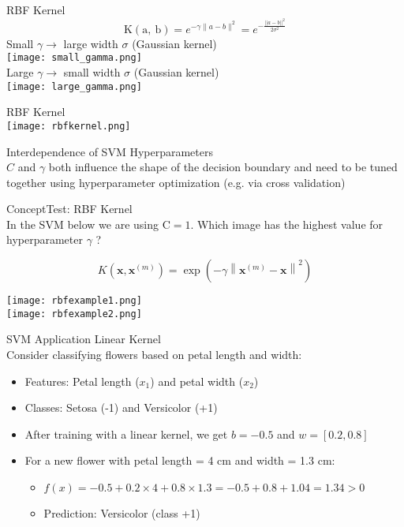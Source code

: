 \begin{definition}{RBF Kernel}
    \[ \mathrm{K}(\mathrm{a}, \mathrm{~b}) = e^{-\gamma\|a-b\|^2} = e^{-\frac{||a-b||^2}{2\sigma^2}} \]
    Small $\gamma \rightarrow$ large width $\sigma$ (Gaussian kernel)\\
    \texttt{[image: small\_gamma.png]}\\
    Large $\gamma \rightarrow$ small width $\sigma$ (Gaussian kernel)\\
    \texttt{[image: large\_gamma.png]}
\end{definition}

\begin{example2}{RBF Kernel}\\
    \texttt{[image: rbfkernel.png]}
\end{example2}

\begin{theorem}{Interdependence of SVM Hyperparameters}\\
    $C$ and $\gamma$ both influence the shape of the decision boundary and need to be tuned together 
    using hyperparameter optimization (e.g. via cross validation)
\end{theorem}

\begin{example2}{ConceptTest: RBF Kernel}\\
    In the SVM below we are using $\mathrm{C}=1$. Which image has the highest value for hyperparameter $\gamma$ ?

    \[ K\left(\mathbf{x}, \mathbf{x}^{(m)}\right)=\exp \left(-\gamma\left\|\mathbf{x}^{(m)}-\mathbf{x}\right\|^2\right) \]

    \texttt{[image: rbfexample1.png]}\\
    \texttt{[image: rbfexample2.png]}
\end{example2}

\begin{example}{SVM Application} Linear Kernel\\
Consider classifying flowers based on petal length and width:
\begin{itemize}
    \item Features: Petal length ($x_1$) and petal width ($x_2$)
    \item Classes: Setosa (-1) and Versicolor (+1)
    \item After training with a linear kernel, we get $b = -0.5$ and $w = [0.2, 0.8]$
    \item For a new flower with petal length = 4 cm and width = 1.3 cm:
    \begin{itemize}
        \item $f(x) = -0.5 + 0.2 \times 4 + 0.8 \times 1.3 = -0.5 + 0.8 + 1.04 = 1.34 > 0$
        \item Prediction: Versicolor (class +1)
    \end{itemize}
\end{itemize}
\end{example}

